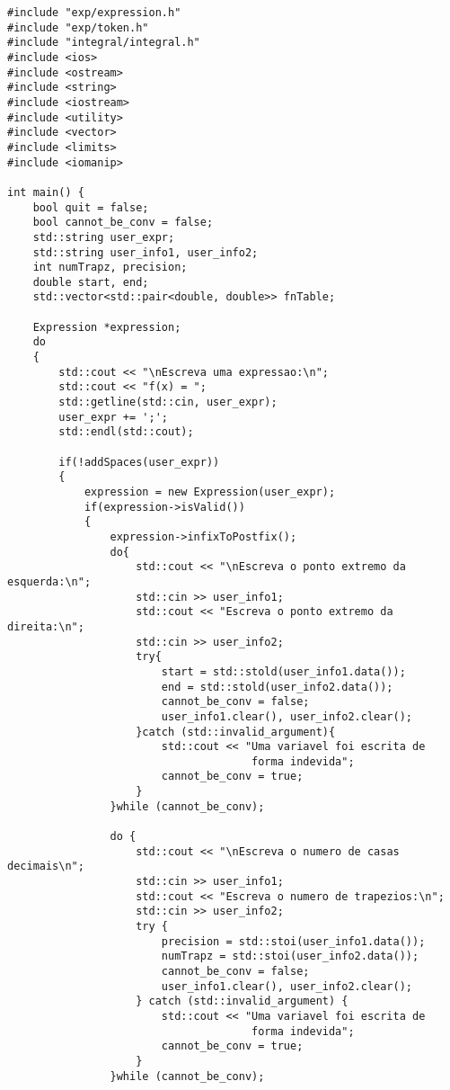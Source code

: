 \documentclass[12pt, letterpaper]{article}
\begin{document}
\begin{lstlisting}[caption=main.cpp]
#include "exp/expression.h"
#include "exp/token.h"
#include "integral/integral.h"
#include <ios>
#include <ostream>
#include <string>
#include <iostream>
#include <utility>
#include <vector>
#include <limits>
#include <iomanip>

int main() {
    bool quit = false;
    bool cannot_be_conv = false;
    std::string user_expr;
    std::string user_info1, user_info2;
    int numTrapz, precision;
    double start, end;
    std::vector<std::pair<double, double>> fnTable;

    Expression *expression;
    do
    {
        std::cout << "\nEscreva uma expressao:\n";
        std::cout << "f(x) = ";
        std::getline(std::cin, user_expr);
        user_expr += ';';
        std::endl(std::cout);

        if(!addSpaces(user_expr))
        {
            expression = new Expression(user_expr);
            if(expression->isValid())
            {
                expression->infixToPostfix();
                do{
                    std::cout << "\nEscreva o ponto extremo da esquerda:\n";
                    std::cin >> user_info1; 
                    std::cout << "Escreva o ponto extremo da direita:\n";
                    std::cin >> user_info2; 
                    try{
                        start = std::stold(user_info1.data()); 
                        end = std::stold(user_info2.data()); 
                        cannot_be_conv = false;
                        user_info1.clear(), user_info2.clear();
                    }catch (std::invalid_argument){
                        std::cout << "Uma variavel foi escrita de 
                                      forma indevida";
                        cannot_be_conv = true;                    
                    }
                }while (cannot_be_conv);

                do {
                    std::cout << "\nEscreva o numero de casas decimais\n"; 
                    std::cin >> user_info1; 
                    std::cout << "Escreva o numero de trapezios:\n";
                    std::cin >> user_info2; 
                    try {
                        precision = std::stoi(user_info1.data());
                        numTrapz = std::stoi(user_info2.data());
                        cannot_be_conv = false;                    
                        user_info1.clear(), user_info2.clear();
                    } catch (std::invalid_argument) {
                        std::cout << "Uma variavel foi escrita de 
                                      forma indevida";
                        cannot_be_conv = true;
                    }
                }while (cannot_be_conv);


\end{lstlisting}
\end{document}
